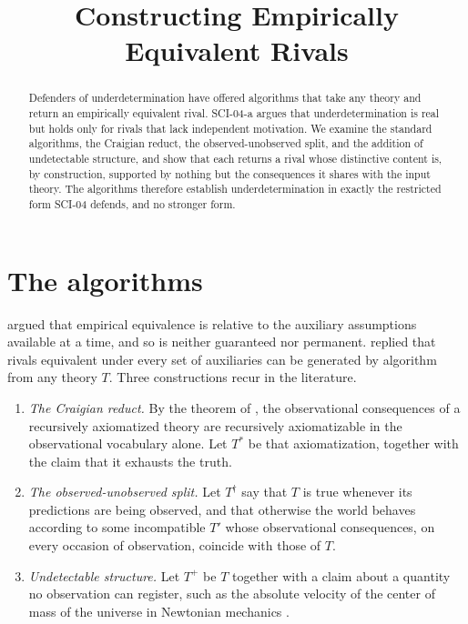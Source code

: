 \documentclass{situationist-preprint}
\title{Constructing Empirically Equivalent Rivals}
\begin{document}
\maketitle

\begin{abstract}
Defenders of underdetermination have offered algorithms that take any theory and return an empirically equivalent rival. SCI-04-a argues that underdetermination is real but holds only for rivals that lack independent motivation. We examine the standard algorithms, the Craigian reduct, the observed-unobserved split, and the addition of undetectable structure, and show that each returns a rival whose distinctive content is, by construction, supported by nothing but the consequences it shares with the input theory. The algorithms therefore establish underdetermination in exactly the restricted form SCI-04 defends, and no stronger form.
\end{abstract}

\section{The algorithms}\label{s:algorithms}

\citet{LaudanLeplin1991} argued that empirical equivalence is relative to the auxiliary assumptions available at a time, and so is neither guaranteed nor permanent. \citet{Kukla1993} replied that rivals equivalent under every set of auxiliaries can be generated by algorithm from any theory $T$. Three constructions recur in the literature.

\begin{enumerate}[label=(A\arabic*)]
\item \emph{The Craigian reduct.} By the theorem of \citet{Craig1956}, the observational consequences of a recursively axiomatized theory are recursively axiomatizable in the observational vocabulary alone. Let $T^{*}$ be that axiomatization, together with the claim that it exhausts the truth.
\item \emph{The observed-unobserved split.} Let $T^{\dagger}$ say that $T$ is true whenever its predictions are being observed, and that otherwise the world behaves according to some incompatible $T'$ whose observational consequences, on every occasion of observation, coincide with those of $T$.
\item \emph{Undetectable structure.} Let $T^{+}$ be $T$ together with a claim about a quantity no observation can register, such as the absolute velocity of the center of mass of the universe in Newtonian mechanics \citep[ch.~3]{vanFraassen1980}.
\end{enumerate}
\end{document}
